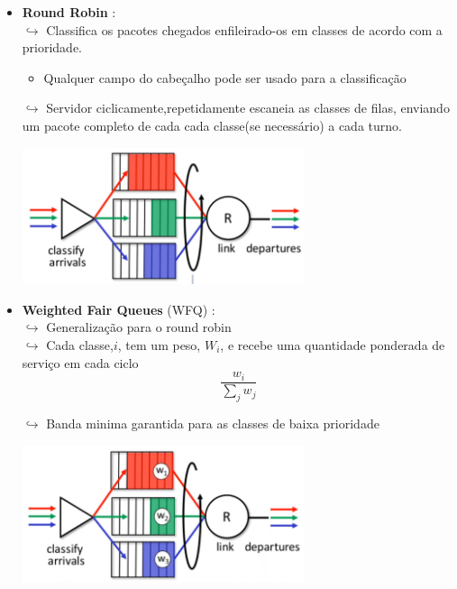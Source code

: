 \begin{itemize}[left=0.5cm, align=left, nosep]
                \item \textbf{Round Robin} : \\
                    $\hookrightarrow$ Classifica os pacotes chegados enfileirado-os em classes de acordo com a prioridade. 
                        \begin{itemize}[left=0.5cm, align=left, nosep]
                            \item Qualquer campo do cabeçalho pode ser usado para a classificação
                        \end{itemize}      
                    $\hookrightarrow$ Servidor ciclicamente,repetidamente escaneia as classes de filas, enviando um pacote completo de cada cada classe(se necessário) a cada turno. 
                    
                    \begin{center}
                        \includegraphics[width=0.65\textwidth]{img/cap-04/round-robin.png}
                    \end{center}
                    
                \item \textbf{Weighted Fair Queues} (WFQ) : \\
                    $\hookrightarrow$ Generalização para o round robin \\
                    $\hookrightarrow$ Cada classe,$i$, tem um peso, $W_i$, e recebe uma quantidade ponderada de serviço em cada ciclo
                        \[
                            \frac{w_i}{\sum_{j}^{} w_j}  
                        \]    
                    
                    $\hookrightarrow$ Banda minima garantida para as classes de baixa prioridade 
                    
                    \begin{center}
                        \includegraphics[width=0.65\textwidth]{img/cap-04/wfq.png}
                    \end{center}
            
            \end{itemize} 

